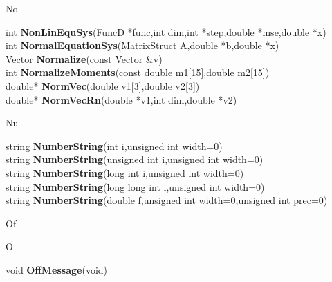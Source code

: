 \documentclass[10pt,titlepage]{article}
\def\functionlistentry#1#2#3#4#5#6{\noindent #1 {\bf #2}(#3) \dotfill #6\\}
\def\letterref#1{}
\def\letterlabel#1{\vspace{0.5cm}\centerline{\Large #1}}
\def\letterlabelend#1{}
\begin{document}
{{\letterlabel{No}
\letterref{A}
\letterref{B}
\letterref{C}
\letterref{D}
\letterref{E}
\letterref{F}
\letterref{G}
\letterref{H}
\letterref{I}
\letterref{K}
\letterref{L}
\letterref{M}
\letterref{N}
\letterref{O}
\letterref{P}
\letterref{Q}
\letterref{R}
\letterref{S}
\letterref{T}
\letterref{U}
\letterref{V}
\letterref{W}
\letterref{X}
\letterref{Y}
\letterref{Z}

\letterref{Ne}
\letterref{No}
\letterref{Nu}
\letterlabelend{No}
\functionlistentry{int}{NonLinEquSys}{FuncD *func,int dim,int *step,double *mse,double *x}{1127}{matrixAlgebra}{}
\functionlistentry{int}{NormalEquationSys}{MatrixStruct A,double *b,double *x}{1126}{matrixAlgebra}{}
\functionlistentry{\hyperlink{Vector}{Vector}}{Normalize}{const \hyperlink{Vector}{Vector} \&v}{253}{datastructures}{}
\functionlistentry{int}{NormalizeMoments}{const double m1[15],double m2[15]}{1614}{obsolet}{}
\functionlistentry{double*}{NormVec}{double v1[3],double v2[3]}{1560}{obsolet}{}
\functionlistentry{double*}{NormVecRn}{double *v1,int dim,double *v2}{1570}{obsolet}{}

\letterlabel{Nu}
\letterref{A}
\letterref{B}
\letterref{C}
\letterref{D}
\letterref{E}
\letterref{F}
\letterref{G}
\letterref{H}
\letterref{I}
\letterref{K}
\letterref{L}
\letterref{M}
\letterref{N}
\letterref{O}
\letterref{P}
\letterref{Q}
\letterref{R}
\letterref{S}
\letterref{T}
\letterref{U}
\letterref{V}
\letterref{W}
\letterref{X}
\letterref{Y}
\letterref{Z}

\letterref{Ne}
\letterref{No}
\letterref{Nu}
\letterlabelend{Nu}
\functionlistentry{string}{NumberString}{int i,unsigned int width=0}{1404}{genericTools}{}
\functionlistentry{string}{NumberString}{unsigned int i,unsigned int width=0}{1405}{genericTools}{}
\functionlistentry{string}{NumberString}{long int i,unsigned int width=0}{1406}{genericTools}{}
\functionlistentry{string}{NumberString}{long long int i,unsigned int width=0}{1407}{genericTools}{}
\functionlistentry{string}{NumberString}{double f,unsigned int width=0,unsigned int prec=0}{1408}{genericTools}{}

\letterlabel{Of}
\letterlabel{O}
\letterref{A}
\letterref{B}
\letterref{C}
\letterref{D}
\letterref{E}
\letterref{F}
\letterref{G}
\letterref{H}
\letterref{I}
\letterref{K}
\letterref{L}
\letterref{M}
\letterref{N}
\letterref{O}
\letterref{P}
\letterref{Q}
\letterref{R}
\letterref{S}
\letterref{T}
\letterref{U}
\letterref{V}
\letterref{W}
\letterref{X}
\letterref{Y}
\letterref{Z}

\letterref{Of}
\letterref{On}
\letterref{Op}
\letterref{Or}
\letterlabelend{Of}
\functionlistentry{void}{OffMessage}{void}{1547}{errorHandling}{}

}}
\end{document}
